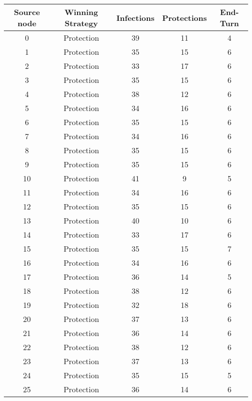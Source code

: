 \documentclass[results.tex]{subfiles}
\begin{document}
\begin{center}
  \begin{tabular}{| c || c | c | c | c |}
    \hline
    {\bfseries Source node} & {\bfseries Winning Strategy} & {\bfseries Infections} & {\bfseries Protections} & {\bfseries End-Turn} \\  %
    \hline\hline
    0 & Protection & 39 & 11 & 4 \\ 
    \hline
    1 & Protection & 35 & 15 & 6 \\ 
    \hline
    2 & Protection & 33 & 17 & 6 \\ 
    \hline
    3 & Protection & 35 & 15 & 6 \\ 
    \hline
    4 & Protection & 38 & 12 & 6 \\ 
    \hline
    5 & Protection & 34 & 16 & 6 \\ 
    \hline
    6 & Protection & 35 & 15 & 6 \\ 
    \hline
    7 & Protection & 34 & 16 & 6 \\ 
    \hline
    8 & Protection & 35 & 15 & 6 \\ 
    \hline
    9 & Protection & 35 & 15 & 6 \\ 
    \hline
    10 & Protection & 41 & 9 & 5 \\ 
    \hline
    11 & Protection & 34 & 16 & 6 \\ 
    \hline
    12 & Protection & 35 & 15 & 6 \\ 
    \hline
    13 & Protection & 40 & 10 & 6 \\ 
    \hline
    14 & Protection & 33 & 17 & 6 \\ 
    \hline
    15 & Protection & 35 & 15 & 7 \\ 
    \hline
    16 & Protection & 34 & 16 & 6 \\ 
    \hline
    17 & Protection & 36 & 14 & 5 \\ 
    \hline
    18 & Protection & 38 & 12 & 6 \\ 
    \hline
    19 & Protection & 32 & 18 & 6 \\ 
    \hline
    20 & Protection & 37 & 13 & 6 \\ 
    \hline
    21 & Protection & 36 & 14 & 6 \\ 
    \hline
    22 & Protection & 38 & 12 & 6 \\ 
    \hline
    23 & Protection & 37 & 13 & 6 \\ 
    \hline
    24 & Protection & 35 & 15 & 5 \\ 
    \hline
    25 & Protection & 36 & 14 & 6 \\ 

\end{tabular}
\end{center}
\end{document}
